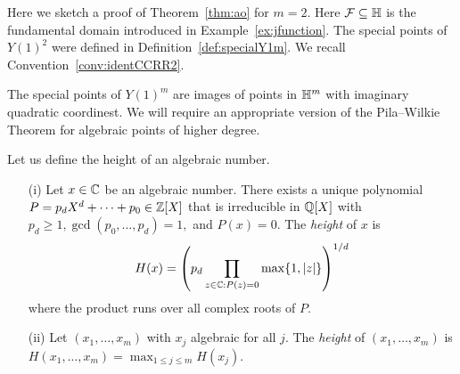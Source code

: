 Here we sketch a proof of Theorem~\ref{thm:ao} for $m=2$. Here ${\mathcal F}
\subseteq{\mathbb{H}}$ is the fundamental domain introduced in
Example~\ref{ex:jfunction}. The special points of $Y(1)^2$ were
defined in Definition~\ref{def:specialY1m}. We recall
Convention~\ref{conv:identCCRR2}. 


The special points of $Y(1)^m$ are images of points in ${\mathbb{H}}^m$ with
imaginary quadratic coordinest.
We will require an appropriate version of the Pila--Wilkie
Theorem for algebraic points of higher degree.

Let us define the height of an algebraic number.

\begin{definition}
  \label{def:height2}
  
  \begin{enumerate}
  \item [(i)] Let $x\in{\mathbb{C}}$ be an algebraic number. There exists
    a unique polynomial $P=p_dX^d+\cdots+p_0\in {\mathbb{Z}}[X]$ that is
    irreducible in ${\mathbb{Q}}[X]$ with $p_d\ge
    1,
    \gcd(p_0,\ldots,p_d)=1,$ and $P(x)=0$. The \emph{height} of $x$
    is
    \begin{equation*}
      H(x) = \left(p_d \prod_{z\in {\mathbb{C}} : P(z)=0} \max\{1,|z|\}\right)^{1/d}
    \end{equation*}
    where the product runs over all complex roots of $P$.
  \item[(ii)] Let $(x_1,\ldots,x_m)$ with $x_j$
    algebraic for all $j$. The \emph{height} of
    $(x_1,\ldots,x_m)$ is
    $H(x_1,\ldots,x_m) = \max_{1\le j\le m}H(x_j)$. 
  \end{enumerate}
\end{definition}

